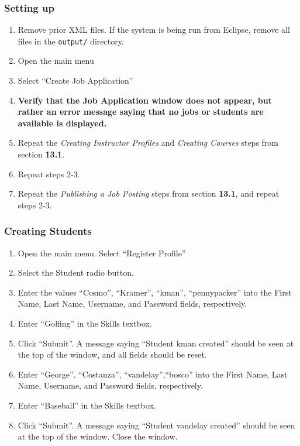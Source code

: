 \documentclass[12pt]{report}
\begin{document}
\subsubsection{Setting up}
\begin{enumerate}
	\item Remove prior XML files. If the system is being run from Eclipse, remove all files in the
		\texttt{output/} directory.
	\item Open the main menu
	\item Select ``Create Job Application''
	\item \textbf{Verify that the Job Application window does not appear, but rather an error
		message saying that no jobs or students are available is displayed.}
	\item Repeat the \textit{Creating Instructor Profiles} and \textit{Creating Courses} steps from
		section \textbf{13.1}.
	\item Repeat steps 2-3.
	\item Repeat the \textit{Publishing a Job Posting} steps from section \textbf{13.1}, and repeat
		steps 2-3.
\end{enumerate}
\subsubsection{Creating Students}
\begin{enumerate}
	\item Open the main menu. Select ``Register Profile''
	\item Select the Student radio button.
	\item Enter the values ``Cosmo'', ``Kramer'', ``kman'', ``pennypacker'' into the First Name,
		Last Name, Username, and Password fields, respectively.
	\item Enter ``Golfing'' in the Skills textbox.
	\item Click ``Submit''. A message saying ``Student kman created'' should be seen at the top of
		the window, and all fields should be reset.
	\item Enter ``George'', ``Costanza'', ``vandelay'',``bosco'' into the First Name, Last Name,
		Username, and Password fields, respectively.
	\item Enter ``Baseball'' in the Skills textbox.
	\item Click ``Submit''. A message saying ``Student vandelay created'' should be seen at the top
		of the window. Close the window.
\end{enumerate}
\end{document}
